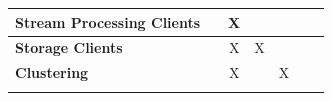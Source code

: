 \begin{landscape}
\begin{table}[h]
\begin{tabular}{|p{3cm}|p{3cm}|p{3cm}|p{3cm}|l|l|l|}
        \multicolumn{1}{|l|}{\textbf{Stream Processing Clients}} & \multicolumn{1}{l|}{}                             & \multicolumn{1}{c|}{X}                             & \multicolumn{1}{l|}{}                   & \multicolumn{1}{c|}{}                     & \multicolumn{1}{l|}{}                                   & \multicolumn{1}{l|}{}                           \\ \hline
        \multicolumn{1}{|l|}{\textbf{Storage Clients}}           & \multicolumn{1}{l|}{}                             & \multicolumn{1}{c|}{X}                             & \multicolumn{1}{c|}{X}                  & \multicolumn{1}{l|}{}                     & \multicolumn{1}{l|}{}                                   & \multicolumn{1}{l|}{}                           \\ \hline
        \multicolumn{1}{|l|}{\textbf{Clustering}}                & \multicolumn{1}{l|}{}                             & \multicolumn{1}{c|}{X}                             & \multicolumn{1}{l|}{}                   & \multicolumn{1}{c|}{X}                    & \multicolumn{1}{l|}{}                                   & \multicolumn{1}{l|}{}                           \\ \hline
                                                                 &                                                   &                                                    &                                         &                                           &                                                         &                                                 \\ \hline
    \end{tabular}
\end{table}
\end{landscape}

